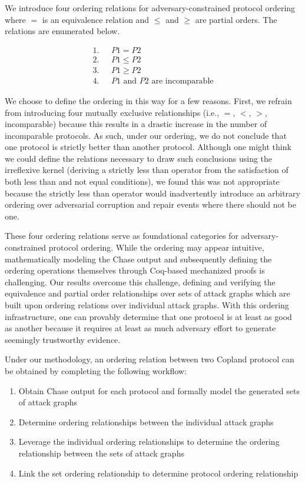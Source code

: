 \documentclass[runningheads]{llncs}
\theoremstyle{definition}
\newcommand{\squash}{\itemsep=0pt\parskip=0pt}
\begin{document}
We introduce four ordering relations for adversary-constrained protocol ordering where $=$ is an equivalence relation and $\le$ and $\ge$ are partial orders. The relations are enumerated below.

\vspace*{-5mm}

\begin{align*}
1. & \text{ } P1 = P2 \\
2. & \text{ } P1 \le P2 \\
3. & \text{ } P1 \ge P2 \\
4. & \text{ } P1 \text{ and } P2 \text{ are incomparable}
\end{align*}

\noindent We choose to define the ordering in this way for a few reasons. First, we refrain from introducing four mutually exclusive relationships (i.e., $=$, $<$, $>$, incomparable) because this results in a drastic increase in the number of incomparable protocols. As such, under our ordering, we do not conclude that one protocol is strictly better than another protocol. Although one might think we could define the relations necessary to draw such conclusions using the irreflexive kernel (deriving a strictly less than operator from the satisfaction of both less than and not equal conditions), we found this was not appropriate because the strictly less than operator would inadvertently introduce an arbitrary ordering over adversarial corruption and repair events where there should not be one.  


These four ordering relations serve as foundational categories for adversary-constrained protocol ordering. While the ordering may appear intuitive, mathematically modeling the Chase output and subsequently defining the ordering operations themselves through Coq-based mechanized proofs is challenging. Our results overcome this challenge, defining and verifying the equivalence and partial order relationships over sets of attack graphs which are built upon ordering relations over individual attack graphs. With this ordering infrastructure, one can provably determine that one protocol is at least as good as another because it requires at least as much adversary effort to generate seemingly trustworthy evidence. 

Under our methodology, an ordering relation between two Copland protocol can be obtained by completing the following workflow:

\begin{enumerate}
    \squash
    \item Obtain Chase output for each protocol and formally model the generated sets of attack graphs
    \item Determine ordering relationships between the individual attack graphs
    \item Leverage the individual ordering relationships to determine the ordering relationship between the sets of attack graphs
    \item Link the set ordering relationship to determine protocol ordering relationship
\end{enumerate}
\end{document}
